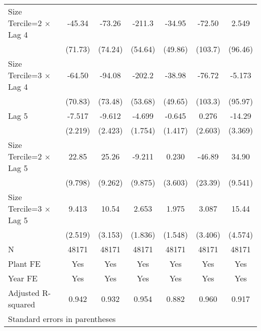 \begin{table}[htbp]
\begin{tabular}{l*{6}{c}}
\addlinespace
Size Tercile=2 $\times$ Lag 4&   -45.34         &   -73.26         &   -211.3\sym{***}&   -34.95         &   -72.50         &    2.549         \\
                &  (71.73)         &  (74.24)         &  (54.64)         &  (49.86)         &  (103.7)         &  (96.46)         \\
\addlinespace
Size Tercile=3 $\times$ Lag 4&   -64.50         &   -94.08         &   -202.2\sym{***}&   -38.98         &   -76.72         &   -5.173         \\
                &  (70.83)         &  (73.48)         &  (53.68)         &  (49.65)         &  (103.3)         &  (95.97)         \\
\addlinespace
Lag 5           &   -7.517\sym{***}&   -9.612\sym{***}&   -4.699\sym{**} &   -0.645         &    0.276         &   -14.29\sym{***}\\
                &  (2.219)         &  (2.423)         &  (1.754)         &  (1.417)         &  (2.603)         &  (3.369)         \\
\addlinespace
Size Tercile=2 $\times$ Lag 5&    22.85\sym{*}  &    25.26\sym{**} &   -9.211         &    0.230         &   -46.89\sym{*}  &    34.90\sym{***}\\
                &  (9.798)         &  (9.262)         &  (9.875)         &  (3.603)         &  (23.39)         &  (9.541)         \\
\addlinespace
Size Tercile=3 $\times$ Lag 5&    9.413\sym{***}&    10.54\sym{***}&    2.653         &    1.975         &    3.087         &    15.44\sym{***}\\
                &  (2.519)         &  (3.153)         &  (1.836)         &  (1.548)         &  (3.406)         &  (4.574)         \\
\midrule
N               &    48171         &    48171         &    48171         &    48171         &    48171         &    48171         \\
Plant FE        &      Yes         &      Yes         &      Yes         &      Yes         &      Yes         &      Yes         \\
Year FE         &      Yes         &      Yes         &      Yes         &      Yes         &      Yes         &      Yes         \\
Adjusted R-squared&    0.942         &    0.932         &    0.954         &    0.882         &    0.960         &    0.917         \\
\bottomrule
\multicolumn{7}{l}{\footnotesize Standard errors in parentheses}\\

\end{tabular}
\end{table}
